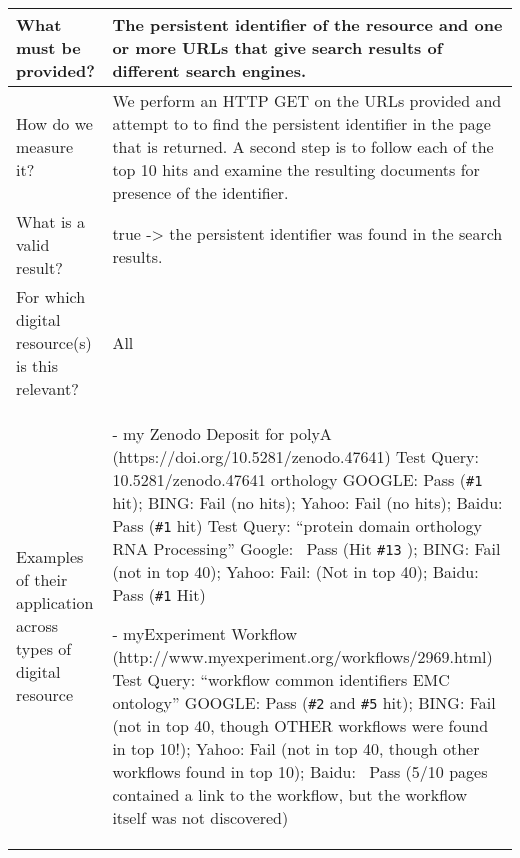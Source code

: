 \documentclass[english]{article}
\begin{document}
\begin{longtable}{|p{5cm}|p{9cm}|}
  
\\



\hline
What must be provided? &  


The persistent identifier of the resource and one or more URLs that give search results of different search engines.



\\



\hline
How do we measure it? &  


We perform an HTTP GET on the URLs provided and attempt to to find the persistent identifier in the page that is returned. A second step is to follow each of the top 10 hits and examine the resulting documents for presence of the identifier. 


\\



\hline
What is a valid result? &  


true -> the persistent identifier was found in the search results.


\\



\hline
For which digital resource(s) is this relevant? &  All\\



\hline
Examples of their application across types of digital resource &  


- my Zenodo Deposit for polyA \newline 
(https://doi.org/10.5281/zenodo.47641)\newline 
Test Query:  10.5281/zenodo.47641  orthology\newline 
GOOGLE: Pass (\verb|#1| hit);  BING:  Fail (no hits); Yahoo: Fail (no hits); Baidu: Pass (\verb|#1| hit) 
\newline 
Test Query: “protein domain orthology RNA Processing”\newline 
Google:  ~Pass (Hit \verb|#13| ); BING:  Fail (not in top 40); Yahoo:  Fail:  (Not in top 40); Baidu: Pass (\verb|#1| Hit)\newline 

- myExperiment Workflow (http://www.myexperiment.org/workflows/2969.html)\newline 
Test Query: “workflow common identifiers EMC ontology”\newline 
GOOGLE:  Pass (\verb|#2| and \verb|#5| hit); BING: Fail (not in top 40, though OTHER workflows were found in top 10!); Yahoo: Fail (not in top 40, though other workflows found in top 10); Baidu: ~Pass (5/10 pages contained a link to the workflow, but the workflow itself was not discovered)\newline 


\end{longtable}
\end{document}
